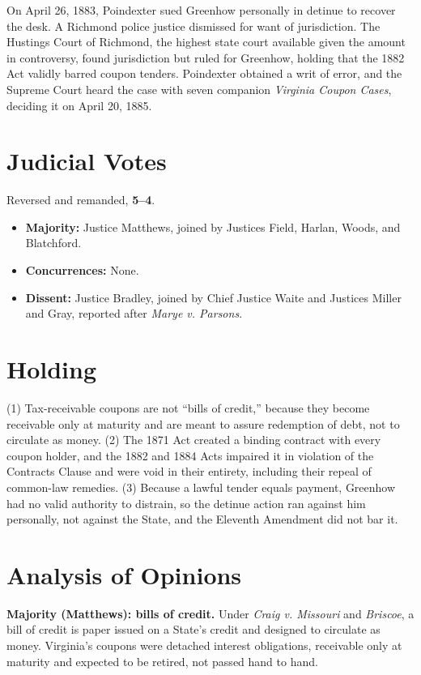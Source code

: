 \documentclass[12pt]{article}
\begin{document}
On April 26, 1883, Poindexter sued Greenhow personally in detinue to recover the desk. A Richmond police justice dismissed for want of jurisdiction. The Hustings Court of Richmond, the highest state court available given the amount in controversy, found jurisdiction but ruled for Greenhow, holding that the 1882 Act validly barred coupon tenders. Poindexter obtained a writ of error, and the Supreme Court heard the case with seven companion \textit{Virginia Coupon Cases}, deciding it on April 20, 1885.

\section{Judicial Votes}

Reversed and remanded, \textbf{5--4}.
\begin{itemize}
\item \textbf{Majority:} Justice Matthews, joined by Justices Field, Harlan, Woods, and Blatchford.
\item \textbf{Concurrences:} None.
\item \textbf{Dissent:} Justice Bradley, joined by Chief Justice Waite and Justices Miller and Gray, reported after \textit{Marye v. Parsons}.
\end{itemize}

\section{Holding}

(1) Tax-receivable coupons are not ``bills of credit,'' because they become receivable only at maturity and are meant to assure redemption of debt, not to circulate as money. (2) The 1871 Act created a binding contract with every coupon holder, and the 1882 and 1884 Acts impaired it in violation of the Contracts Clause and were void in their entirety, including their repeal of common-law remedies. (3) Because a lawful tender equals payment, Greenhow had no valid authority to distrain, so the detinue action ran against him personally, not against the State, and the Eleventh Amendment did not bar it.

\section{Analysis of Opinions}

\textbf{Majority (Matthews): bills of credit.} Under \textit{Craig v. Missouri} and \textit{Briscoe}, a bill of credit is paper issued on a State's credit and designed to circulate as money. Virginia's coupons were detached interest obligations, receivable only at maturity and expected to be retired, not passed hand to hand.
\end{document}
